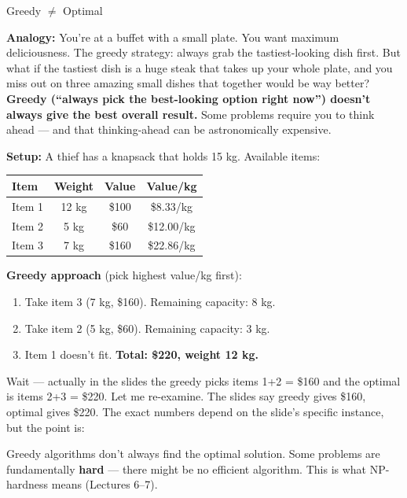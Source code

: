 \documentclass[11pt,a4paper]{article}
\newcommand{\kt}[1]{\par\vspace{0.3em}\colorbox{yellow!60}{\parbox{\dimexpr\linewidth-2\fboxsep}{#1}}\vspace{0.3em}}
\begin{document}
\begin{examplebox}{Greedy $\neq$ Optimal}

\textbf{Analogy:} You're at a buffet with a small plate. You want maximum deliciousness. The greedy strategy: always grab the tastiest-looking dish first. But what if the tastiest dish is a huge steak that takes up your whole plate, and you miss out on three amazing small dishes that together would be way better? \textbf{Greedy (``always pick the best-looking option right now'') doesn't always give the best overall result.} Some problems require you to think ahead --- and that thinking-ahead can be astronomically expensive.

\textbf{Setup:} A thief has a knapsack that holds 15 kg. Available items:

\begin{center}
\begin{tabular}{lccc}
\toprule
\textbf{Item} & \textbf{Weight} & \textbf{Value} & \textbf{Value/kg} \\
\midrule
Item 1 & 12 kg & \$100 & \$8.33/kg \\
Item 2 & 5 kg & \$60 & \$12.00/kg \\
Item 3 & 7 kg & \$160 & \$22.86/kg \\
\bottomrule
\end{tabular}
\end{center}

\textbf{Greedy approach} (pick highest value/kg first):
\begin{enumerate}[nosep]
\item Take item 3 (7 kg, \$160). Remaining capacity: 8 kg.
\item Take item 2 (5 kg, \$60). Remaining capacity: 3 kg.
\item Item 1 doesn't fit. \textbf{Total: \$220, weight 12 kg.}
\end{enumerate}

Wait --- actually in the slides the greedy picks items 1+2 = \$160 and the optimal is items 2+3 = \$220. Let me re-examine. The slides say greedy gives \$160, optimal gives \$220. The exact numbers depend on the slide's specific instance, but the point is:

\kt{Greedy algorithms don't always find the optimal solution. Some problems are fundamentally \textbf{hard} --- there might be no efficient algorithm. This is what NP-hardness means (Lectures 6--7).}
\end{examplebox}

\end{document}
